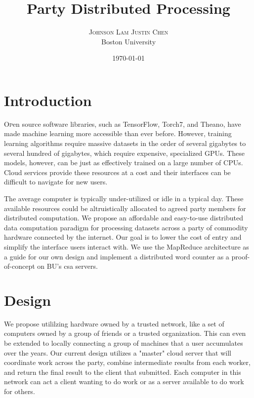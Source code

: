 \documentclass[twoside]{article}
\title{Party Distributed Processing} %
\author{%
\textsc{Johnson Lam \qquad Justin Chen} \\[1ex] %
\normalsize Boston University \\ %
}
\date{\today} %
\begin{document}
\maketitle

\section{Introduction}
\lettrine[nindent=0em,lines=3] Open source software libraries, such as TensorFlow, Torch7, and Theano, have made machine learning more accessible than ever before. However, training learning algorithms require massive datasets in the order of several gigabytes to several hundred of gigabytes, which require expensive, specialized GPUs. These models, however, can be just as effectively trained on a large number of CPUs. Cloud services provide these resources at a cost and their interfaces can be
difficult to navigate for new users. 

The average computer is typically under-utilized or idle in a typical day. These available resources could be altruistically allocated to agreed party members for distributed computation. We propose an affordable and easy-to-use distributed data computation paradigm for processing datasets across a party of commodity hardware connected by the internet. Our goal is to lower the cost of entry and simplify the interface users interact with. We use the MapReduce architecture as a guide for our own
design and implement a distributed word counter as a proof-of-concept on BU's csa servers.

\section{Design}
We propose utililzing hardware owned by a trusted network, like a set of computers owned by a group of friends or a trusted organization. This can even be extended to locally connecting a group of machines that a user accumulates over the years. Our current design utilizes a "master" cloud server that will coordinate work across the party, combine intermediate results from each worker, and return the final result to the client that submitted. Each computer in this network can act a client wanting to do work or as a server available to do work for others. 
\end{document}
